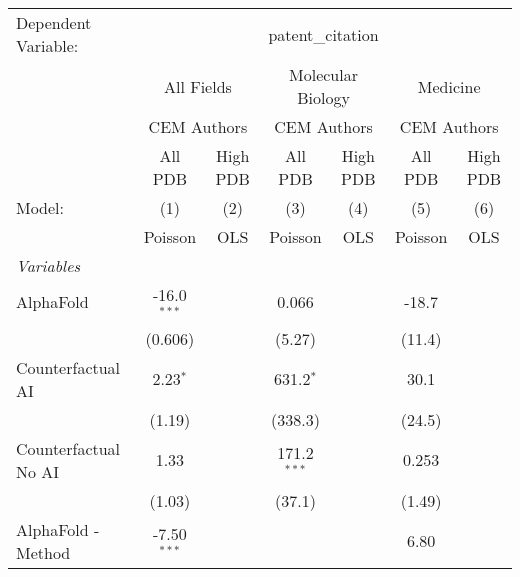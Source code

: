 \begingroup
\centering
\begin{tabular}{lcccccc}
   \tabularnewline \midrule \midrule
   Dependent Variable: & \multicolumn{6}{c}{patent\_citation}\\
 & \multicolumn{2}{c}{All Fields} & \multicolumn{2}{c}{Molecular Biology} & \multicolumn{2}{c}{Medicine} \\
\cmidrule(lr){2-3} \cmidrule(lr){4-5} \cmidrule(lr){6-7}
 & \multicolumn{2}{c}{CEM Authors} & \multicolumn{2}{c}{CEM Authors} & \multicolumn{2}{c}{CEM Authors} \\
\cmidrule(lr){2-3} \cmidrule(lr){4-5} \cmidrule(lr){6-7}
 & \multicolumn{1}{c}{All PDB} & \multicolumn{1}{c}{High PDB} & \multicolumn{1}{c}{All PDB} & \multicolumn{1}{c}{High PDB} & \multicolumn{1}{c}{All PDB} & \multicolumn{1}{c}{High PDB} \\
\cmidrule(lr){2-2} \cmidrule(lr){3-3} \cmidrule(lr){4-4} \cmidrule(lr){5-5} \cmidrule(lr){6-6} \cmidrule(lr){7-7}
   Model:                                                     & (1)           & (2)  & (3)           & (4)  & (5)           & (6)\\  
                                                              &  Poisson      & OLS  & Poisson       & OLS  & Poisson       & OLS\\  
   \midrule
   \emph{Variables}\\
   AlphaFold                                                  & -16.0$^{***}$ &      & 0.066         &      & -18.7         &   \\   
                                                              & (0.606)       &      & (5.27)        &      & (11.4)        &   \\   
   Counterfactual AI                                          & 2.23$^{*}$    &      & 631.2$^{*}$   &      & 30.1          &   \\   
                                                              & (1.19)        &      & (338.3)       &      & (24.5)        &   \\   
   Counterfactual No AI                                       & 1.33          &      & 171.2$^{***}$ &      & 0.253         &   \\   
                                                              & (1.03)        &      & (37.1)        &      & (1.49)        &   \\   
   AlphaFold - Method                                         & -7.50$^{***}$ &      &               &      & 6.80          &   \\   

\end{tabular}
